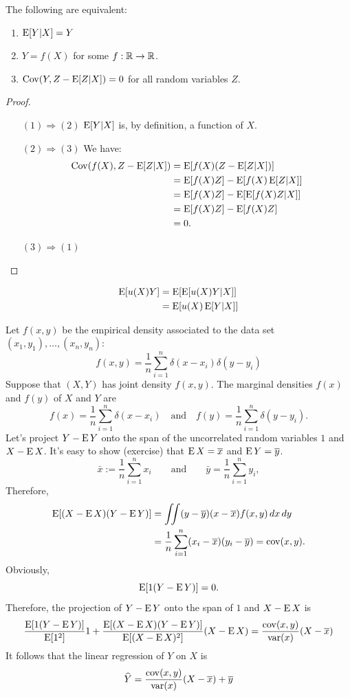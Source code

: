 \documentclass[12pt]{amsart}
\begin{document}
\begin{lemma}
    The following are equivalent:
    \begin{enumerate}
        \setlength{\itemsep}{1em}
        \item $\operatorname{E}[Y|X]=Y$
        \item $Y=f(X)$ for some $f:\mathbb{R}\to\mathbb{R}$.
        \item $\operatorname{Cov}(Y, Z-\operatorname{E}[Z|X])=0$ for all random variables $Z$.
    \end{enumerate}
\end{lemma}
\begin{proof}\hfill
    \begin{enumerate}
        \item[$(1)\Rightarrow(2)$] $\operatorname{E}[Y|X]$ is, by definition, a function of $X$.
        \item[$(2)\Rightarrow(3)$] We have:
        \begin{align*}
            \operatorname{Cov}(f(X), Z-\operatorname{E}[Z|X])
            &= \operatorname{E}[f(X)(Z-\operatorname{E}[Z|X])]\\
            &= \operatorname{E}[f(X)Z] - \operatorname{E}[f(X)\operatorname{E}[Z|X]]\\
            &= \operatorname{E}[f(X)Z] - \operatorname{E}[\operatorname{E}[f(X)Z|X]]\\
            &= \operatorname{E}[f(X)Z] - \operatorname{E}[f(X)Z]\\
            &= 0.
        \end{align*}
        \item[$(3)\Rightarrow(1)$] 
    \end{enumerate}
\end{proof}


\begin{align*}
    \operatorname{E}[u(X)Y] &= \operatorname{E}[\operatorname{E}[u(X)Y|X]]\\
    &=\operatorname{E}[u(X)\operatorname{E}[Y|X]]\\
\end{align*}

Let $f(x,y)$ be the empirical density associated to the data set 
$(x_1,y_1),\ldots,(x_n, y_n)$:
\[
    f(x,y) = \frac1n\sum_{i=1}^n \delta(x - x_i)\delta(y - y_i)
\]
Suppose that $(X,Y)$ has joint density $f(x,y)$.
The marginal densities $f(x)$ and $f(y)$ of $X$ and $Y$ are
\[
    f(x) =  \frac1n\sum_{i=1}^n\delta(x - x_i)\quad\text{and}\quad
f(y) = \frac1n\sum_{i=1}^n\delta(y - y_i).
\]
Let's project $Y-\operatorname{E} Y$ onto the span of the uncorrelated random variables $1$ and $X-\operatorname{E} X$.
It's easy to show (exercise) that $\operatorname{E} X=\overline x$ and $\operatorname{E} Y = \overline y$.
\[
    \bar x := \frac1n\sum_{i=1}^n x_i\qquad\text{and}\qquad
    \bar y = \frac1n\sum_{i=1}^n y_i,
\]
Therefore,
\begin{align*}
    \operatorname{E}[(X - \operatorname{E} X)(Y - \operatorname{E} Y)] &= \iint (y-\overline y)(x - \overline x)f(x,y)\,dx\,dy\\
    &= \frac1n\sum_{i=1}^n(x_i - \overline x)(y_i - \overline y) = \operatorname{cov}(x, y).
\end{align*}
Obviously,
\[
    \operatorname{E}[1(Y-\operatorname{E} Y)] = 0.
\]
Therefore, the projection of $Y - \operatorname{E} Y$ onto the span of $1$ and $X - \operatorname{E} X$ is
\[\frac{\operatorname{E}[1(Y - \operatorname{E} Y)]}{\operatorname{E}[1^2]} 1 + \frac{\operatorname{E}[(X-\operatorname{E} X)(Y - \operatorname{E} Y)]}{\operatorname{E}[(X-\operatorname{E} X)^2]}(X - \operatorname{E} X) = \frac{\operatorname{cov}(x,y)}{\operatorname{var}(x)}(X-\overline x)\]
It follows that the linear regression of $Y$ on $X$ is
\[
\widehat Y = \frac{\operatorname{cov}(x,y)}{\operatorname{var}(x)}(X-\overline x) + \overline y
\]
\end{document}
